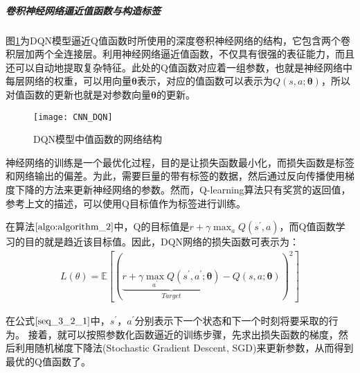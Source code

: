 
 \subparagraph{卷积神经网络逼近值函数与构造标签}
图\ref{fig:CNN_DQN}为DQN模型逼近Q值函数时所使用的深度卷积神经网络的结构，它包含两个卷积层加两个全连接层。利用神经网络逼近值函数，不仅具有很强的表征能力，而且还可以自动地提取复杂特征。此处的Q值函数对应着一组参数，也就是神经网络中每层网络的权重，可以用向量$\bm{\theta}$表示，对应的值函数可以表示为$Q(s,a;\bm{\theta})$，所以对值函数的更新也就是对参数向量$\bm{\theta}$的更新。
\begin{figure}[htbp]
\centering
\texttt{[image: CNN\_DQN]}
\caption{DQN模型中值函数的网络结构}
\label{fig:CNN_DQN}
\end{figure}

神经网络的训练是一个最优化过程，目的是让损失函数最小化，而损失函数是标签和网络输出的偏差。为此，需要巨量的带有标签的数据，然后通过反向传播使用梯度下降的方法来更新神经网络的参数。然而，Q-learning算法只有奖赏的返回值，参考上文的描述，可以使用Q目标值作为标签进行训练。

在算法$\ref{algo:algorithm_2}$中，Q的目标值是$r+\gamma \max_{a}Q(s^{'},a)$，而Q值函数学习的目的就是趋近该目标值。因此，DQN网络的损失函数可表示为：
\begin{equation}
\label{seq_3_2_1}
\begin{aligned}
L(\theta)=\mathbb{E}[(\underbrace{r+\gamma\max_{a^{'}} Q(s^{'},a^{'};\bm{\theta})}_{Target}-Q(s,a;\bm{\theta}))^{2}]
\end{aligned}
\end{equation}

在公式$\eqref{seq_3_2_1}$中，$s^{'}$，$a^{'}$分别表示下一个状态和下一个时刻将要采取的行为。
接着，就可以按照参数化函数逼近的训练步骤，先求出损失函数的梯度，然后利用随机梯度下降法(Stochastic Gradient Descent, SGD)来更新参数，从而得到最优的Q值函数了。


